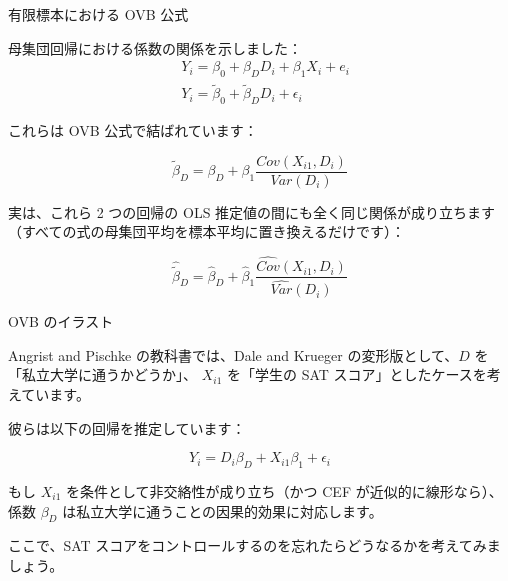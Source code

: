 \documentclass[11pt,handout]{beamer}
\newenvironment{wideitemize}{\itemize\addtolength{\itemsep}{10pt}}{\enditemize}
\begin{document}
\begin{frame}{有限標本における OVB 公式}
	\begin{wideitemize}
		\item
		母集団回帰における係数の関係を示しました：
		\begin{align}
		 & Y_i = \beta_0 + \beta_D D_i + \beta_1 X_i + e_i \\
		 & Y_i = \tilde\beta_0 + \tilde\beta_D D_i + \epsilon_i 
		\end{align}
	
	\noindent これらは OVB 公式で結ばれています：
	
	$$\tilde{\beta}_D=\beta_D+\beta_1\frac{Cov(X_{i1},D_i)}{Var(D_i)}$$
	
	\pause
	\item
	実は、これら 2 つの回帰の OLS 推定値の間にも全く同じ関係が成り立ちます（すべての式の母集団平均を標本平均に置き換えるだけです）：
	
	$$\hat{\tilde{\beta}}_D= \hat{\beta}_D+ \hat{\beta}_1\frac{\widehat{Cov}(X_{i1},D_i)}{\widehat{Var}(D_i)}$$

	\end{wideitemize}
\end{frame}

\begin{frame}{OVB のイラスト}
	\begin{wideitemize}
		\item
		Angrist and Pischke の教科書では、Dale and Krueger の変形版として、$D$ を「私立大学に通うかどうか」、 $X_{i1}$ を「学生の SAT スコア」としたケースを考えています。
		
		\pause
		\item
		彼らは以下の回帰を推定しています：
		
		$$Y_{i} = D_i \beta_D + X_{i1}\beta_1 + \epsilon_i $$
		
		\pause
		\item
		もし $X_{i1}$ を条件として非交絡性が成り立ち（かつ CEF が近似的に線形なら）、係数 $\beta_D$ は私立大学に通うことの因果的効果に対応します。
		
		\pause
		\item
		ここで、SAT スコアをコントロールするのを忘れたらどうなるかを考えてみましょう。
	\end{wideitemize}
\end{frame}
\end{document}
